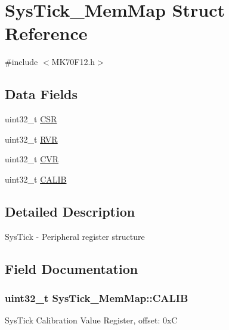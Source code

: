 \hypertarget{struct_sys_tick___mem_map}{}\section{Sys\+Tick\+\_\+\+Mem\+Map Struct Reference}
\label{struct_sys_tick___mem_map}


{\ttfamily \#include $<$M\+K70\+F12.\+h$>$}

\subsection*{Data Fields}
\begin{DoxyCompactItemize}
\item 
uint32\+\_\+t \hyperlink{struct_sys_tick___mem_map_aec23689880afd46876916055403e867a}{C\+S\+R}
\item 
uint32\+\_\+t \hyperlink{struct_sys_tick___mem_map_a3f2018b492fd4bc1d141a718d499e50f}{R\+V\+R}
\item 
uint32\+\_\+t \hyperlink{struct_sys_tick___mem_map_a508dd628bc347f199e7baf4b1bfbfa0d}{C\+V\+R}
\item 
uint32\+\_\+t \hyperlink{struct_sys_tick___mem_map_a9e83c524401ad455c84d5a9738ca3d4d}{C\+A\+L\+I\+B}
\end{DoxyCompactItemize}


\subsection{Detailed Description}
Sys\+Tick -\/ Peripheral register structure 

\subsection{Field Documentation}
\hypertarget{struct_sys_tick___mem_map_a9e83c524401ad455c84d5a9738ca3d4d}{}
\subsubsection[{C\+A\+L\+I\+B}]{\setlength{\rightskip}{0pt plus 5cm}uint32\+\_\+t Sys\+Tick\+\_\+\+Mem\+Map\+::\+C\+A\+L\+I\+B}\label{struct_sys_tick___mem_map_a9e83c524401ad455c84d5a9738ca3d4d}
Sys\+Tick Calibration Value Register, offset\+: 0x\+C \hypertarget{struct_sys_tick___mem_map_aec23689880afd46876916055403e867a}{}
